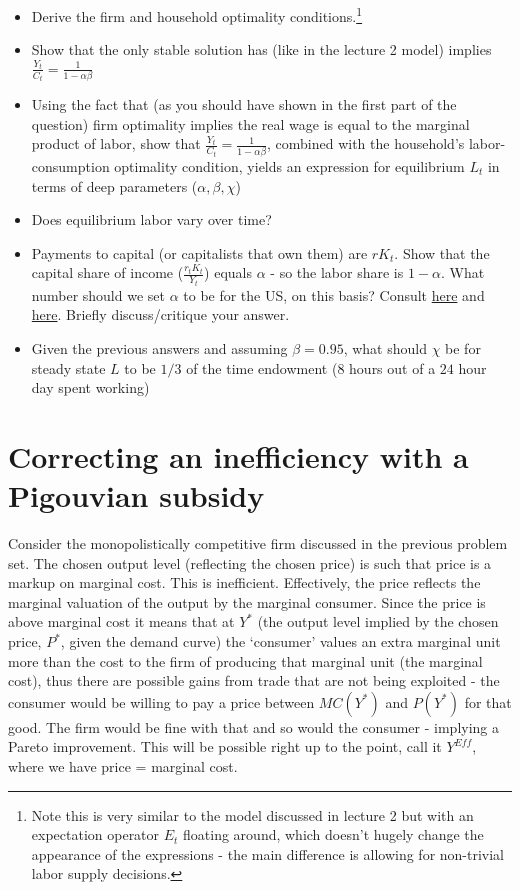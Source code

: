 \documentclass[authoryear,11pt]{elsarticle}
\begin{document}
\begin{itemize}
\item	Derive the firm and household optimality conditions.\footnote{Note this is very similar to the model discussed in lecture 2 but with an expectation operator $E_{t}$ floating around, which doesn't hugely change the appearance of the expressions - the main difference is allowing for non-trivial labor supply decisions.}
\item	Show that the only stable solution has (like in the lecture 2 model) implies $\frac{Y_{t}}{C_{t}} = \frac{1}{1-\alpha \beta}$
\item	Using the fact that (as you should have shown in the first part of the question) firm optimality implies the real wage is equal to the marginal product of labor, show that $\frac{Y_{t}}{C_{t}} = \frac{1}{1-\alpha \beta}$, combined with the household's labor-consumption optimality condition, yields an expression for equilibrium $L_{t}$ in terms of deep parameters ($\alpha, \beta, \chi$)
\item	Does equilibrium labor vary over time?
\item	Payments to capital (or capitalists that own them) are $r K_{t}$. Show that the capital share of income ($\frac{r_{t} K_{t}}{Y_{t}}$) equals $\alpha$ - so the labor share is $1-\alpha$. What number should we set $\alpha$ to be for the US, on this basis? Consult \href{https://www.bls.gov/opub/mlr/2017/article/estimating-the-us-labor-share.htm}{here} and \href{https://fred.stlouisfed.org/series/PRS85006173}{here}. Briefly discuss/critique your answer.
\item	Given the previous answers and assuming $\beta = 0.95$, what should $\chi$ be for steady state $L$ to be $1/3$ of the time endowment ($8$ hours out of a $24$ hour day spent working)
\end{itemize}


\section{Correcting an inefficiency with a Pigouvian subsidy}
Consider the monopolistically competitive firm discussed in the previous problem set. The chosen output level (reflecting the chosen price) is such that price is a markup on marginal cost. This is inefficient. Effectively, the price reflects the marginal valuation of the output by the marginal consumer. Since the price is above marginal cost it means that at $Y^{\ast}$ (the output level implied by the chosen price, $P^{\ast}$, given the demand curve) the `consumer' values an extra marginal unit more than the cost to the firm of producing that marginal unit (the marginal cost), thus there are possible gains from trade that are not being exploited - the consumer would be willing to pay a price between $MC(Y^{\ast})$ and $P(Y^{\ast})$ for that good. The firm would be fine with that and so would the consumer - implying a Pareto improvement. This will be possible right up to the point, call it $Y^{Eff}$, where we have price = marginal cost.
\end{document}
